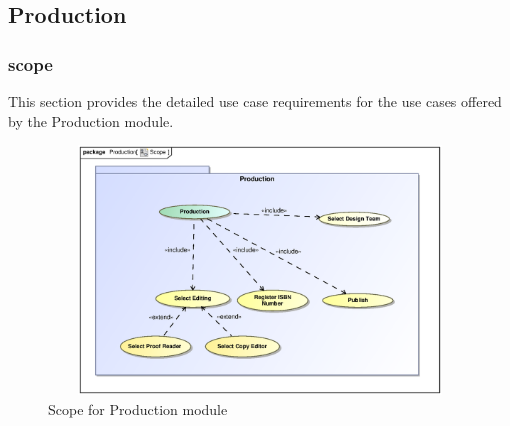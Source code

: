 \newpage
\subsection{Production}

\subsubsection{scope}
\par{This section provides the detailed use case requirements for the use cases offered by the Production
module.}

\begin{figure}[h]
	\includegraphics[height=250px, width=500px]{epsImages/Production/Scope.eps}
	\caption{Scope for Production module}
\end{figure}

\newpage
